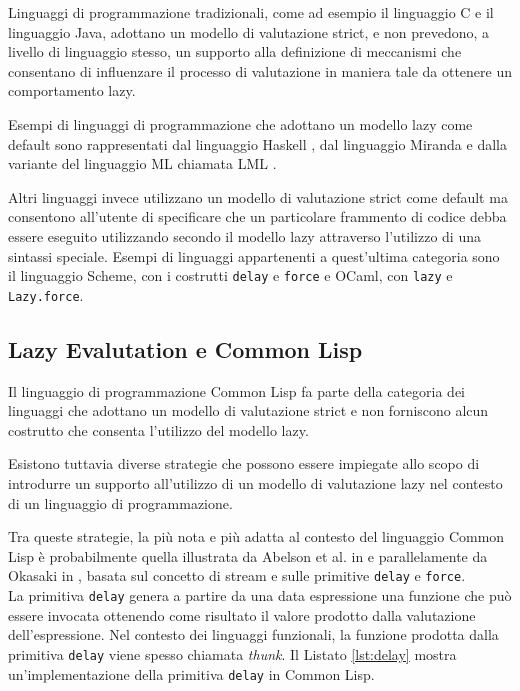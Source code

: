 Linguaggi di programmazione tradizionali, come ad esempio il linguaggio C e il
linguaggio Java, adottano un modello di valutazione strict, e non prevedono, a
livello di linguaggio stesso, un supporto alla definizione di meccanismi che
consentano di influenzare il processo di valutazione in maniera tale da ottenere
un comportamento lazy.

Esempi di linguaggi di programmazione che adottano un modello lazy come default
sono rappresentati dal linguaggio Haskell \cite{DBLP:conf/hopl/HudakHJW07}, dal
linguaggio Miranda \cite{DBLP:journals/eatcs/Turner87} e dalla variante del
linguaggio ML chiamata LML \cite{DBLP:conf/lfp/Augustsson84}.

Altri linguaggi invece utilizzano un modello di valutazione strict come default
ma consentono all'utente di specificare che un particolare frammento di codice
debba essere eseguito utilizzando secondo il modello lazy attraverso l'utilizzo
di una sintassi speciale. Esempi di linguaggi appartenenti a quest'ultima
categoria sono il linguaggio Scheme, con i costrutti \texttt{delay} e
\texttt{force} e OCaml, con \texttt{lazy} e \texttt{Lazy.force}.

\subsection{Lazy Evalutation e Common Lisp}
\label{lazy-eval-cl}

Il linguaggio di programmazione Common Lisp fa parte della categoria dei
linguaggi che adottano un modello di valutazione strict e non forniscono alcun
costrutto che consenta l'utilizzo del modello lazy.

Esistono tuttavia diverse strategie che possono essere impiegate allo scopo di
introdurre un supporto all'utilizzo di un modello di valutazione lazy nel
contesto di un linguaggio di programmazione.

Tra queste strategie, la più nota e più adatta al contesto del linguaggio Common
Lisp è probabilmente quella illustrata da Abelson et al. in \cite{Abelson1996} e
parallelamente da Okasaki in \cite{DBLP:conf/afp/Okasaki96}, basata sul concetto
di stream e sulle primitive \texttt{delay} e \texttt{force}.\\

La primitiva \texttt{delay} genera a partire da una data espressione una
funzione che può essere invocata ottenendo come risultato il valore prodotto
dalla valutazione dell'espressione. Nel contesto dei linguaggi funzionali, la
funzione prodotta dalla primitiva \texttt{delay} viene spesso chiamata
\textit{thunk}. Il Listato \ref{lst:delay} mostra un'implementazione della
primitiva \texttt{delay} in Common Lisp.

